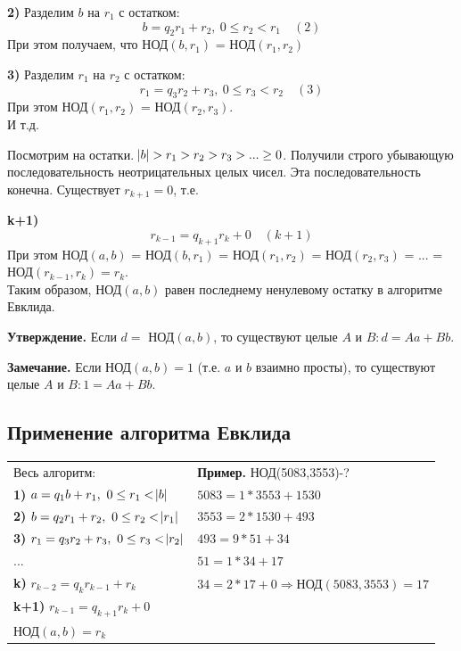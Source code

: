 \documentclass{article}
\begin{document}
            \textbf{2)} Разделим \( b \) на \( r_1 \) с остатком: \[ b = q_2r_1 + r_2,\ 0 \leq r_2 < r_1\quad (2) \]
            При этом получаем, что НОД\( (b,r_1) \) = НОД\( (r_1,r_2) \)

            \textbf{3)} Разделим \( r_1 \) на \( r_2 \) с остатком: \[ r_1 = q_3r_2 + r_3,\ 0 \leq r_3 < r_2\quad (3) \]
            При этом НОД\( (r_1, r_2) \) = НОД\( (r_2, r_3) \).\\
            И т.д.

            Посмотрим на остатки. \( \abs{b} > r_1 > r_2 > r_3 > ... \geq 0 \). Получили строго убывающую последовательность неотрицательных целых чисел. Эта последовательность конечна. Существует \( r_{k+1} = 0 \), т.е.

            \textbf{k+1)} \[ r_{k-1} = q_{k+1}r_k + 0\quad (k+1) \]
            При этом НОД\( (a,b) \) = НОД\( (b,r_1) \) = НОД\( (r_1,r_2) \) = НОД\( (r_2,r_3) \) = ... = НОД\( (r_{k-1},r_k) = r_k \).\\
            Таким образом, НОД\( (a,b) \) равен последнему ненулевому остатку в алгоритме Евклида.

            \textbf{Утверждение.} Если \( d = \textrm{ НОД}(a,b) \), то существуют целые \( A \) и \( B: d = Aa + Bb \).

    		\textbf{Замечание.} Если \( \textrm{НОД}(a,b) = 1 \) (т.е. \( a \) и \( b \) взаимно просты), то существуют целые \( A \) и \( B: 1 = Aa + Bb \).

        \subsection{Применение алгоритма Евклида}
            \begin{tabular}{ll}
              Весь алгоритм: & \textbf{Пример.} НОД(5083,3553)-?\\
              \textbf{1)} \( a = q_1b + r_1,\ 0 \leq r_1 < \abs{b} \) & \( 5083 = 1*3553 + 1530 \)\\
              \textbf{2)} \( b = q_2r_1 + r_2,\ 0 \leq r_2 < \abs{r_1} \) & \( 3553 = 2*1530 + 493 \)\\
              \textbf{3)} \( r_1 = q_3r_2 + r_3,\ 0 \leq r_3 < \abs{r_2} \) & \( 493 = 9*51 + 34 \)\\
              ...& \( 51 = 1*34 + 17 \)\\
              \textbf{k)} \( r_{k-2} = q_kr_{k-1} + r_k \) & \( 34 = 2*17 + 0 \Rightarrow \textrm{НОД}(5083,3553) = 17\)\\
              \textbf{k+1)} \( r_{k-1} = q_{k+1}r_{k} + 0 \) & \\
              \( \textrm{НОД}(a,b) = r_k \) & \\
            \end{tabular}
			
\end{document}
